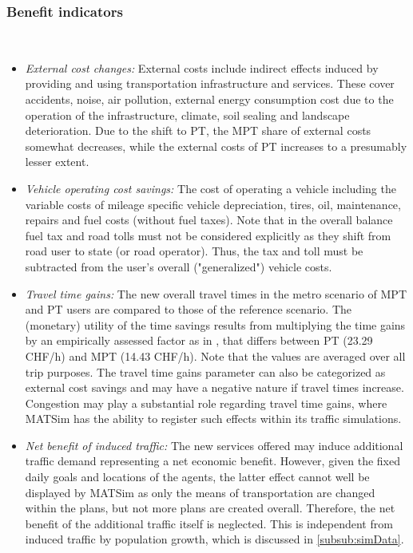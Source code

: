 \subsubsection{Benefit indicators}\mbox{}\\[-5ex]
\begin{itemize}
	\item \textit{External cost changes:} External costs include indirect effects induced by providing and using transportation infrastructure and services. These cover accidents, noise, air pollution, external energy consumption cost due to the operation of the infrastructure, climate, soil sealing and landscape deterioration. Due to the shift to PT, the MPT share of external costs somewhat decreases, while the external costs of PT increases to a presumably lesser extent.
	\item \textit{Vehicle operating cost savings:} The cost of operating a vehicle including the variable costs of mileage specific vehicle depreciation, tires, oil, maintenance, repairs and fuel costs (without fuel taxes). Note that in the overall balance fuel tax and road tolls must not be considered explicitly as they shift from road user to state (or road operator). Thus, the tax and toll must be subtracted from the user's overall ("generalized") vehicle costs.
	\item \textit{Travel time gains:} The new overall travel times in the metro scenario of MPT and PT users are compared to those of the reference scenario. The (monetary) utility of the time savings results from multiplying the time gains by an empirically assessed factor as in \cite{VSS_Norm_KNA6418227_2009Own}, that differs between PT (23.29 CHF/h) and MPT (14.43 CHF/h). Note that the values are averaged over all trip purposes. The travel time gains parameter can also be categorized as external cost savings and may have a negative nature if travel times increase. Congestion may play a substantial role regarding travel time gains, where MATSim has the ability to register such effects within its traffic simulations. 
	\item \textit{Net benefit of induced traffic:} The new services offered may induce additional traffic demand representing a net economic benefit. However, given the fixed daily goals and locations of the agents, the latter effect cannot well be displayed by MATSim as only the means of transportation are changed within the plans, but not more plans are created overall. Therefore, the net benefit of the additional traffic itself is neglected. This is independent from induced traffic by population growth, which is discussed in \ref{subsub:simData}.
\end{itemize}

